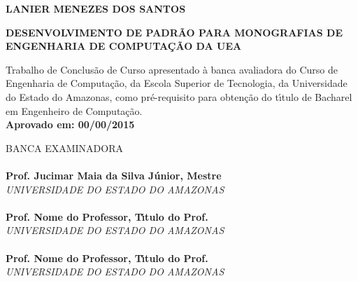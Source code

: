 \begin{center}
\bf LANIER MENEZES DOS SANTOS\\[1.5 cm]
\end{center}

\begin{center}
\bf DESENVOLVIMENTO DE PADR\~{A}O PARA MONOGRAFIAS DE ENGENHARIA DE COMPUTA\c{C}\~{A}O DA UEA\\[1.5cm]
\end{center}

\hspace*{8cm}
\begin{minipage}{8cm} 

Trabalho de Conclus\~{a}o de Curso apresentado \`{a} 
banca avaliadora do Curso de Engenharia de Computa\c{c}\~{a}o, 
da Escola Superior de Tecnologia, da Universidade do Estado do Amazonas, 
como pr\'e-requisito para obten\c{c}\~{a}o do t\'{\i}tulo de Bacharel em
Engenheiro de Computa\c{c}\~{a}o.\\

\large \bf Aprovado em: 00/00/2015
\end{minipage} 

BANCA EXAMINADORA\\[12 pt]

\noindent \hrulefill \hspace*{6cm} \\
\noindent \textbf{Prof. Jucimar Maia da Silva J\'{u}nior, Mestre}\\
\textit{UNIVERSIDADE DO ESTADO DO AMAZONAS}\\[0.5cm]

\noindent \hrulefill \hspace*{6cm} \\
\noindent \textbf{Prof. Nome do Professor, T\'{\i}tulo do Prof.}\\
\textit{UNIVERSIDADE DO ESTADO DO AMAZONAS}\\[0.5cm]

\noindent \hrulefill \hspace*{6cm} \\
\noindent \textbf{Prof. Nome do Professor, T\'{\i}tulo do Prof.}\\
\textit{UNIVERSIDADE DO ESTADO DO AMAZONAS}\\